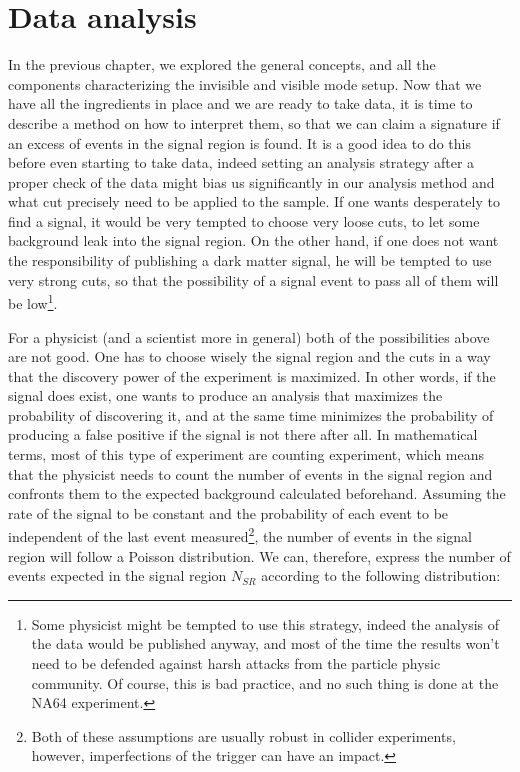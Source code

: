 
\newcommand{\pdirthree}{chapters/plots/chapter3}

\chapter{Data analysis} %
\label{chapter3} %


In the previous chapter, we explored the general concepts, and all the components characterizing the invisible and visible mode setup. Now that we have all the ingredients in place and we are ready to take data, it is time to describe a method on how to interpret them, so that we can claim a signature if an excess of events in the signal region is found. It is a good idea to do this before even starting to take data, indeed setting an analysis strategy after a proper check of the data might bias us significantly in our analysis method and what cut precisely need to be applied to the sample. If one wants desperately to find a signal, it would be very tempted to choose very loose cuts, to let some background leak into the signal region. On the other hand, if one does not want the responsibility of publishing a dark matter signal, he will be tempted to use very strong cuts, so that the possibility of a signal event to pass all of them will be low\footnote{Some physicist might be tempted to use this strategy, indeed the analysis of the data would be published anyway, and most of the time the results won't need to be defended against harsh attacks from the particle physic community. Of course, this is bad practice, and no such thing is done at the NA64 experiment.}.

For a physicist (and a scientist more in general) both of the possibilities above are not good. One has to choose wisely the signal region and the cuts in a way that the discovery power of the experiment is maximized. In other words, if the signal does exist, one wants to produce an analysis that maximizes the probability of discovering it, and at the same time minimizes the probability of producing a false positive if the signal is not there after all. In mathematical terms, most of this type of experiment are counting experiment, which means that the physicist needs to count the number of events in the signal region and confronts them to the expected background calculated beforehand. Assuming the rate of the signal to be constant and the probability of each event to be independent of the last event measured\footnote{Both of these assumptions are usually robust in collider experiments, however, imperfections of the trigger can have an impact.}, the number of events in the signal region will follow a Poisson distribution. We can, therefore, express the number of events expected in the signal region $N_{SR}$ according to the following distribution:


